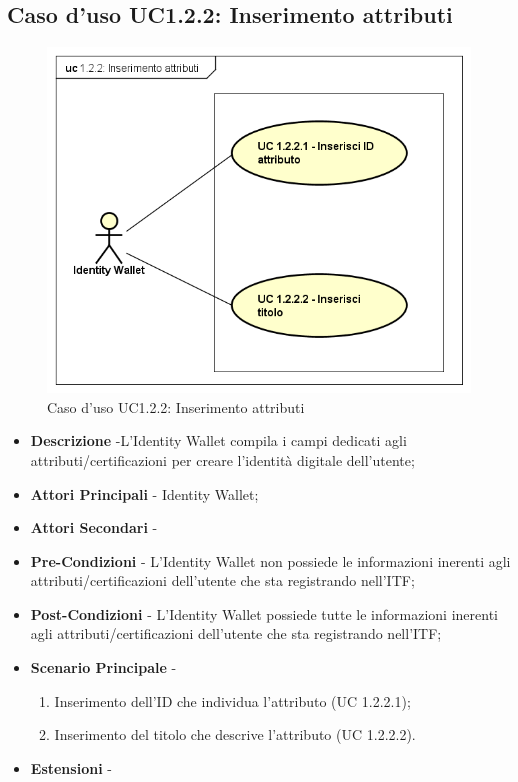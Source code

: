 \subsection{Caso d'uso UC1.2.2: Inserimento attributi}
\begin{figure}[h]
	\centering
	\includegraphics[scale=0.50]{immagini/usecase/UC122_InserimentoAttributi}
	\caption{Caso d'uso UC1.2.2: Inserimento attributi}
\end{figure}
\begin{itemize}
	\item \textbf{Descrizione} -L'Identity Wallet compila i campi dedicati agli attributi/certificazioni per creare l'identità digitale dell'utente;
	\item \textbf{Attori Principali} - Identity Wallet;
	\item \textbf{Attori Secondari} -
	\item \textbf{Pre-Condizioni} - L'Identity Wallet non possiede le informazioni inerenti agli attributi/certificazioni dell'utente che sta registrando nell'\gls{ITF};
	\item \textbf{Post-Condizioni} - L'Identity Wallet possiede tutte le informazioni inerenti agli attributi/certificazioni dell'utente che sta registrando nell'\gls{ITF};
	\item \textbf{Scenario Principale} -
	\begin{enumerate}
		\item Inserimento dell'ID che individua l'attributo (UC 1.2.2.1);
		\item Inserimento del titolo che descrive l'attributo (UC 1.2.2.2).
	\end{enumerate}
	\item \textbf{Estensioni} -
\end{itemize}
\newpage

